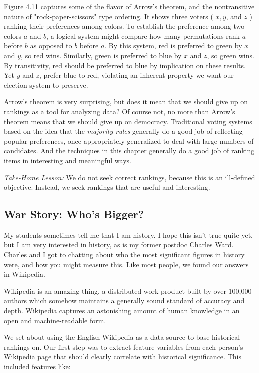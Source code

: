 \documentclass[10pt]{article}
\begin{document}
Figure 4.11 captures some of the flavor of Arrow's theorem, and the nontransitive nature of "rock-paper-scissors" type ordering. It shows three voters ( $x, y$, and $z$ ) ranking their preferences among colors. To establish the preference among two colors $a$ and $b$, a logical system might compare how many permutations rank $a$ before $b$ as opposed to $b$ before $a$. By this system, red is preferred to green by $x$ and $y$, so red wins. Similarly, green is preferred to blue by $x$ and $z$, so green wins. By transitivity, red should be preferred to blue by implication on these results. Yet $y$ and $z$, prefer blue to red, violating an inherent property we want our election system to preserve.

Arrow's theorem is very surprising, but does it mean that we should give up on rankings as a tool for analyzing data? Of course not, no more than Arrow's theorem means that we should give up on democracy. Traditional voting systems based on the idea that the \emph{majority rules} generally do a good job of reflecting popular preferences, once appropriately generalized to deal with large numbers of candidates. And the techniques in this chapter generally do a good job of ranking items in interesting and meaningful ways.

\emph{Take-Home Lesson:} We do not seek correct rankings, because this is an ill-defined objective. Instead, we seek rankings that are useful and interesting.

\subsection{War Story: Who's Bigger?}
My students sometimes tell me that I am history. I hope this isn't true quite yet, but I am very interested in history, as is my former postdoc Charles Ward. Charles and I got to chatting about who the most significant figures in history were, and how you might measure this. Like most people, we found our answers in Wikipedia.

Wikipedia is an amazing thing, a distributed work product built by over 100,000 authors which somehow maintains a generally sound standard of accuracy and depth. Wikipedia captures an astonishing amount of human knowledge in an open and machine-readable form.

We set about using the English Wikipedia as a data source to base historical rankings on. Our first step was to extract feature variables from each person's Wikipedia page that should clearly correlate with historical significance. This included features like:
\end{document}
